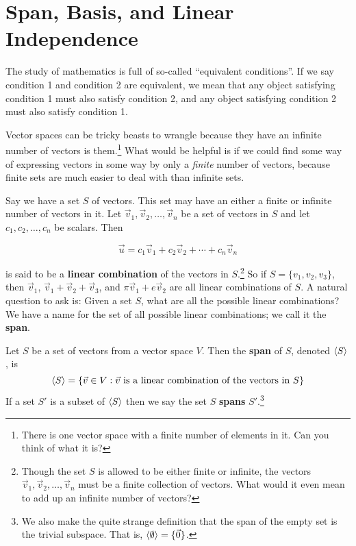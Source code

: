 \section{Span, Basis, and Linear Independence}

\begin{remark}
	The study of mathematics is full of so-called ``equivalent conditions''. If we say condition 1 and condition 2 are equivalent, we mean that any object satisfying condition 1 must also satisfy condition 2, and any object satisfying condition 2 must also satisfy condition 1. 
\end{remark}

Vector spaces can be tricky beasts to wrangle because they have an infinite number of vectors is them.\footnote{There is one vector space with a finite number of elements in it. Can you think of what it is?} What would be helpful is if we could find some way of expressing vectors in some way by only a \textit{finite} number of vectors, because finite sets are much easier to deal with than infinite sets.

Say we have a set $S$ of vectors. This set may have an either a finite or infinite number of vectors in it. Let $\vec{v}_1, \vec{v}_2, \ldots, \vec{v}_n$ be a set of vectors in $S$ and let $c_1, c_2, \ldots, c_n$ be scalars. Then

$$
\vec{u} = c_1 \vec{v}_1 + c_2 \vec{v}_2 + \cdots + c_n \vec{v}_n 
$$

is said to be a \textbf{linear combination} of the vectors in $S$.\footnote{Though the set $S$ is allowed to be either finite or infinite, the vectors $\vec{v}_1,\vec{v}_2,\ldots,\vec{v}_n$ must be a finite collection of vectors. What would it even mean to add up an infinite number of vectors?} So if $S = \{v_1,v_2,v_3\}$, then $\vec{v}_1$, $\vec{v}_1+\vec{v}_2+\vec{v}_3$, and $\pi \vec{v}_1 + e \vec{v}_2$ are all linear combinations of $S$. A natural question to ask is: Given a set $S$, what are all the possible linear combinations? We have a name for the set of all possible linear combinations; we call it the \textbf{span}.

\begin{definition}
	Let $S$ be a set of vectors from a vector space $V$. Then the \textbf{span} of $S$, denoted $\langle S \rangle$, is
	$$
	\langle S \rangle= \{ \vec{v} \in V : \vec{v} \textnormal{ is a linear combination of the vectors in }S\}
	$$
	If a set $S'$ is a subset of $\langle S \rangle$ then we say the set $S$ \textbf{spans} $S'$.\footnote{We also make the quite strange definition that the span of the empty set is the trivial subspace. That is, $\langle  \emptyset  \rangle = \{\vec{0}\}$.}
\end{definition}

